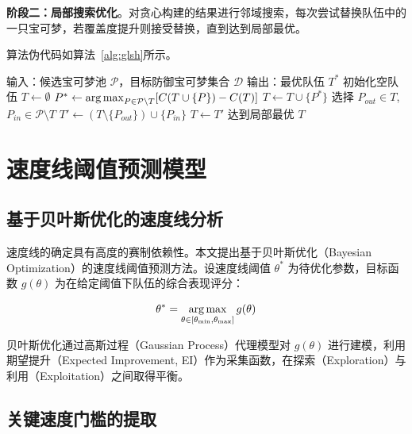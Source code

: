 \textbf{阶段二：局部搜索优化}。对贪心构建的结果进行邻域搜索，每次尝试替换队伍中的一只宝可梦，若覆盖度提升则接受替换，直到达到局部最优。

算法伪代码如算法~\ref{alg:glsh}所示。

\begin{algorithm}[!htbp]
    \small
    \caption{GLSH 属性覆盖优化算法}\label{alg:glsh}
    \begin{algorithmic}[1]
        \State 输入：候选宝可梦池 $\mathcal{P}$，目标防御宝可梦集合 $\mathcal{D}$
        \State 输出：最优队伍 $T^*$
        \State 初始化空队伍 $T \gets \emptyset$
        \Repeat
            \State $P^* \gets \operatorname*{arg\,max}_{P \in \mathcal{P} \setminus T} [C(T \cup \{P\}) - C(T)]$
                \State $T \gets T \cup \{P^*\}$
            \EndIf
        \Repeat
            \State 选择 $P_{out} \in T$, $P_{in} \in \mathcal{P} \setminus T$
            \State $T' \gets (T \setminus \{P_{out}\}) \cup \{P_{in}\}$
                \State $T \gets T'$
            \EndIf
        \Until 达到局部最优
        \State \Return $T$
    \end{algorithmic}
\end{algorithm}

\section{速度线阈值预测模型}

\subsection{基于贝叶斯优化的速度线分析}

速度线的确定具有高度的赛制依赖性。本文提出基于贝叶斯优化（Bayesian Optimization）的速度线阈值预测方法。设速度线阈值 $\theta^*$ 为待优化参数，目标函数 $g(\theta)$ 为在给定阈值下队伍的综合表现评分：

\begin{equation}\label{eq:bayes-opt}
    \theta^* = \operatorname*{arg\,max}_{\theta \in [\theta_{\min}, \theta_{\max}]} g(\theta)
\end{equation}

贝叶斯优化通过高斯过程（Gaussian Process）代理模型对 $g(\theta)$ 进行建模，利用期望提升（Expected Improvement, EI）作为采集函数，在探索（Exploration）与利用（Exploitation）之间取得平衡。

\subsection{关键速度门槛的提取}

